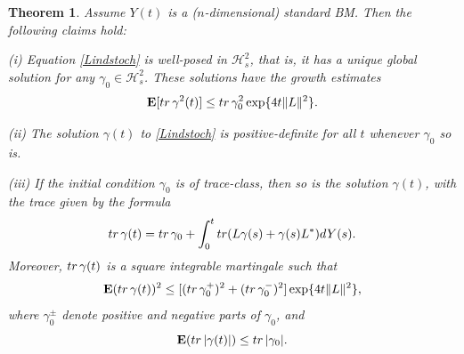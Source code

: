 \documentclass[10pt,a4paper]{amsart}
\def\HC{\mathcal{H}}
\def\E{\mathbf{E}}
\def\tr{\rm{tr}}
\def\ga{\gamma}
\newtheorem{theorem}{Theorem}[section]
\newtheorem{remark}{Remark}
\begin{document}
\begin{theorem}
\label{LindStochLin1}
Assume $Y(t)$ is a ($n$-dimensional) standard BM.
 Then the following claims hold:

(i) Equation \eqref{Lindstoch} is well-posed in $\HC^2_s$, that is,
it has a unique global solution for any $\ga_0\in \HC^2_s$.
These solutions have the growth estimates
 \begin{equation}
\label{Lindstochquadex1}
\E [{\tr}\, \ga^2(t)] \le {\tr}\, \ga_0^2 \exp\{ 4 t\|L\|^2\}.
\end{equation}

(ii) The solution $\ga (t)$ to \eqref{Lindstoch}
is positive-definite for all $t$ whenever $\ga_0$ so is.

(iii) If the initial condition $\ga_0$ is of trace-class,
then so is the solution $\ga(t)$, with the trace given by the formula
\begin{equation}
\label{Lindstochmart}
{\tr} \,\ga(t)={\tr} \, \ga_0+\int_0^t {\tr} (L\ga(s)+\ga(s) L^*) dY(s).
\end{equation}
Moreover, ${\tr} \, \ga(t)$ is a
square integrable martingale such that
\begin{equation}
\label{Lindstochmart1}
\E ({\tr} \,\ga(t))^2\le [({\tr} \, \ga_0^+)^2 +({\tr} \, \ga_0^-)^2]\exp\{ 4t \|L\|^2\},
\end{equation}
where $\ga_0^{\pm}$ denote positive and negative parts of $\ga_0$, and
\begin{equation}
\label{Lindstochmart2}
\E ({\tr} \,|\ga(t)|)\le {\tr} \, |\ga_0|.
\end{equation}

\end{theorem}

\end{document}
